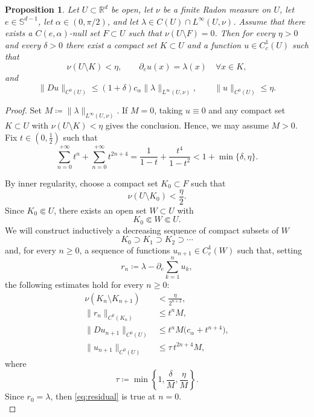 \documentclass[10pt,a4paper]{amsart}
\newtheorem{prop}{Proposition}
\newcommand{\R}{\mathbb{R}}
\begin{document}
\begin{prop}\label{prop:local}
Let $U\subset\R^d$ be open, let $\nu$ be a finite Radon measure on $U$, let $e\in \mathbb{S}^{d-1}$, let $\alpha\in(0,\pi/2)$,
and let $\lambda\in C(U)\cap L^\infty(U, \nu)$.
Assume that there exists a $C(e,\alpha)$-null set $F\subset U$ such that $\nu(U\setminus F)=0$.
Then for every $\eta>0$ and every $\delta>0$ there exist a compact set $K\subset U$ and a function $u\in C^1_c(U)$ such that
$$
\nu(U\setminus K)<\eta,
\qquad
\partial_e u(x)=\lambda(x)\quad\forall x\in K,
$$
and
$$
\|Du\|_{C^0(U)}\le (1+\delta)c_\alpha \|\lambda\|_{L^\infty(U,\nu)},
\qquad
\|u\|_{C^0(U)}\le \eta.
$$
\end{prop}

\begin{proof}
 Set $M \coloneqq \|\lambda\|_{L^\infty(U,\nu)}$.
If $M=0$, taking $u\equiv 0$ and any compact set $K\subset U$ with $\nu(U\setminus K)<\eta$ gives the conclusion.
Hence, we may assume $M>0$.
Fix $t\in \left(0,\frac{1}{2}\right)$ such that
\begin{equation}\label{eq:t_geom_piccola}
    \sum_{n=0}^{+\infty}t^n + \sum_{n=0}^{+\infty}t^{2n+4} =\frac{1}{1-t} + \frac{t^4}{1-t^2}< 1+\min\{\delta,\eta\}.
\end{equation}

By inner regularity, choose a compact set $K_0\subset F$ such that
$$
\nu(U\setminus K_0)<\frac{\eta}{2}.
$$
Since $K_0\Subset U$, there exists an open set $W\subset U$ with
$$
K_0\Subset W\Subset U.
$$
We will construct inductively a decreasing sequence of compact subsets of $W$
$$
K_0\supset K_1\supset K_2\supset\cdots
$$
and, for every $n\geq 0$, a sequence of functions $u_{n+1}\in C^1_c(W)$
such that, setting
$$
r_n\coloneqq \lambda-\partial_e \sum_{k=1}^n u_k,
$$
the following estimates hold for every $n\ge 0$:
\begin{align}
\nu(K_n\setminus K_{n+1}) &< \frac{\eta}{2^{n+2}}, \label{eq:loss}\\
\|r_n\|_{C^0(K_n)} &\le t^n M, \label{eq:residual}\\
\|Du_{n+1}\|_{C^0(U)} &\le t^n M\bigl(c_\alpha+t^{n+4}\bigr), \label{eq:gradstep}\\
\|u_{n+1}\|_{C^0(U)} &\le \tau\,t^{2n+4}M, \label{eq:supstep}
\end{align}
where
$$
\tau\coloneqq \min\left\{1,\frac{\delta}{M}, \frac{\eta}{M}\right\}.
$$
Since $r_0=\lambda$, then \eqref{eq:residual} is true at $n=0$.\\


\end{proof}
\end{document}
